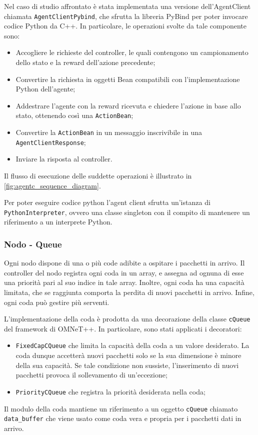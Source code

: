\documentclass[conference]{IEEEtran}
\newcommand{\code}[1]{\texttt{#1}}
\begin{document}
Nel caso di studio affrontato è stata implementata una versione dell'AgentClient chiamata
\code{AgentClientPybind}, che sfrutta la libreria PyBind per poter invocare codice
Python da C++. In particolare, le operazioni svolte da tale componente sono:
\begin{itemize}
    \item Accogliere le richieste del controller, le quali contengono un campionamento
    dello stato e la reward dell'azione precedente;
    \item Convertire la richiesta in oggetti Bean compatibili con l'implementazione Python
    dell'agente;
    \item Addestrare l'agente con la reward ricevuta e chiedere l'azione in base 
    allo stato, ottenendo così una \code{ActionBean};
    \item Convertire la \code{ActionBean} in un messaggio inscrivibile 
    in una \code{AgentClientResponse};
    \item Inviare la risposta al controller.
\end{itemize}
Il flusso di esecuzione delle suddette operazioni è illustrato in \autoref{fig:agentc_sequence_diagram}.

Per poter eseguire codice python l'agent client sfrutta un'istanza di
\code{PythonInterpreter}, ovvero una classe singleton con il compito di mantenere un 
riferimento a un interprete Python.
 
\subsubsection{Nodo - Queue}
Ogni nodo dispone di una o più code adibite a ospitare i pacchetti in arrivo.
Il controller del nodo registra ogni coda in un array, e assegna ad ognuna di esse una
priorità pari al suo indice in tale array. Inoltre, ogni coda ha una capacità limitata,
che se raggiunta comporta la perdita di nuovi pacchetti in arrivo. Infine, ogni coda
può gestire più serventi.

L'implementazione della coda è prodotta da una decorazione della classe \code{cQueue}
del framework di OMNeT++. In particolare, sono stati applicati i decoratori:
\begin{itemize}
    \item \code{FixedCapCQueue} che limita la capacità della coda a un valore desiderato.
    La coda dunque accetterà nuovi pacchetti solo se la sua dimensione è minore della
    sua capacità. Se tale condizione non sussiste, l'inserimento di nuovi pacchetti
    provoca il sollevamento di un'eccezione;
    \item \code{PriorityCQueue} che registra la priorità desiderata nella coda;
\end{itemize}
Il modulo della coda mantiene un riferimento a un oggetto \code{cQueue} chiamato
\code{data\_buffer} che viene usato
come coda vera e propria per i pacchetti dati in arrivo.
\end{document}
